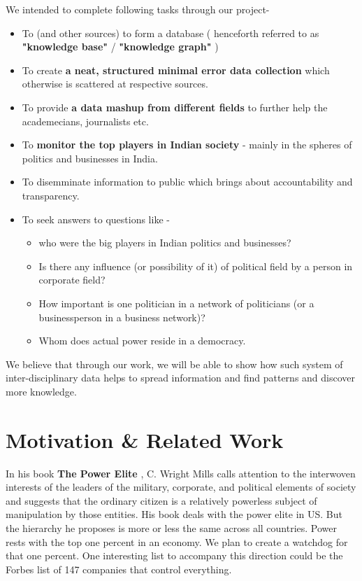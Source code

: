 We intended to complete following tasks through our project-
\begin{itemize}

    \item To  (and other sources) to form a database ( henceforth referred to as \textbf{"knowledge base"} / \textbf{"knowledge graph"} )
    \item To create \textbf{ a neat, structured minimal error data collection } which otherwise is scattered at respective sources.
    \item To provide \textbf{ a data mashup from different fields } to further help the academecians, journalists etc.
    \item To \textbf{ monitor the top players in Indian society } - mainly in the spheres of politics and businesses in India.
    \item To disemminate information to public  which brings about accountability and transparency. 
    \item  To seek answers to questions like -
        \begin{itemize}
         \item who were the big players in Indian politics and businesses?
         \item Is there any influence (or possibility of it) of political field by a person in corporate field?
         \item How important is one politician in a network of politicians (or a businessperson in a business network)?
         \item Whom does actual power reside in a democracy.
        \end{itemize}

\end{itemize}
We believe that through our work, we will be able to show how such system of inter-disciplinary data helps to spread information and find patterns and discover more knowledge.

\section{Motivation \& Related Work}

In his book \textbf{The Power Elite} \cite{Mills}, C. Wright Mills calls attention to the interwoven interests of the leaders of the military, corporate, and political elements of society and suggests that the ordinary citizen is a relatively powerless subject of manipulation by those entities. His book deals with the power elite in US. But the hierarchy he proposes is more or less the same across all countries. Power rests with the top one percent in an economy. We plan to create a watchdog for that one percent. One interesting list to accompany this direction could be the Forbes list \cite{FORBES} of 147 companies that control everything. 

